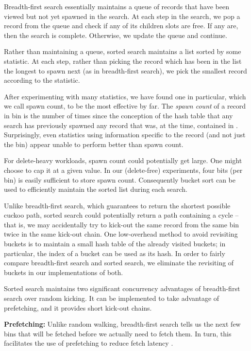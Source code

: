 \documentclass{sig-alternate-05-2015}
\begin{document}
Breadth-first search essentially maintains a queue of records that
have been viewed but not yet spawned in the search. At each step in
the search, we pop a record from the queue and check if any of its
children slots are free. If any are, then the search is
complete. Otherwise, we update the queue and continue.



Rather than maintaining a queue, sorted search maintains a list sorted
by some statistic. At each step, rather than picking the record which
has been in the list the longest to spawn next (as in breadth-first
search), we pick the smallest record according to the statistic.

After experimenting with many statistics, we have found one in
particular, which we call spawn count, to be the most effective
by far. The \emph{spawn count} of a record in bin  is the number of times
since the conception of the hash table that any search has previously
spawned any record that was, at the time, contained in
. Surprisingly, even statistics using information specific to the
record (and not just the bin) appear unable to perform better than
spawn count.



For delete-heavy workloads, spawn count could potentially get
large. One might choose to cap it at a given value. In our
(delete-free) experiments, four bits (per bin) is easily sufficient to
store spawn count. Consequently bucket sort can be used to efficiently
maintain the sorted list during each search.



Unlike breadth-first search, which guarantees to return the shortest
possible cuckoo path, sorted search could potentially return a path
containing a cycle -- that is, we may accidentally try to kick-out the
same record from the same bin twice in the same kick-out chain. One
low-overhead method to avoid revisiting buckets is to maintain a small
hash table of the already visited buckets; in particular, the index of
a bucket can be used as its hash. In order to fairly compare
breadth-first search and sorted search, we eliminate the revisiting of
buckets in our implementations of both.

Sorted search maintains two significant concurrency advantages of
breadth-first search over random kicking. It can be implemented to
take advantage of prefetching, and it provides short kick-out
chains.



\textbf{Prefetching:} Unlike random walking, breadth-first search
tells us the next few bins that will be fetched before we actually
need to fetch them. In turn, this facilitates the use of prefetching to
reduce fetch latency \cite{li14}.
\end{document}
